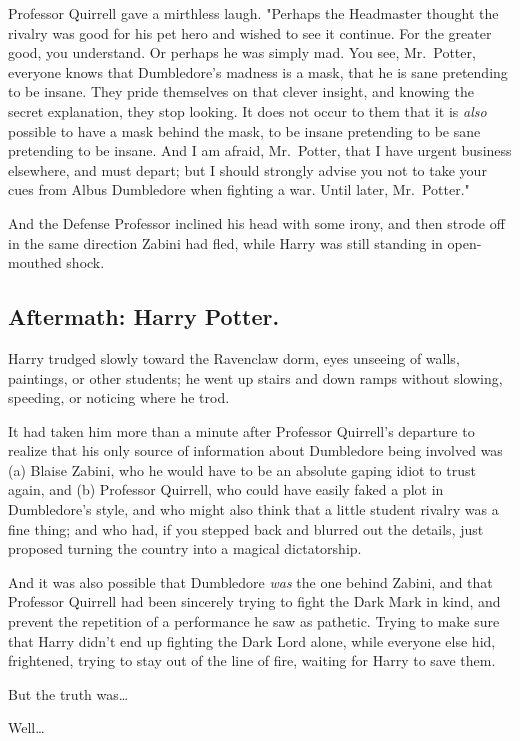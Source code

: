 Professor Quirrell gave a mirthless laugh. "Perhaps the Headmaster thought the 
rivalry was good for his pet hero and wished to see it continue. For the 
greater good, you understand. Or perhaps he was simply mad. You see, 
Mr.~Potter, everyone knows that Dumbledore's madness is a mask, that he is sane 
pretending to be insane. They pride themselves on that clever insight, and 
knowing the secret explanation, they stop looking. It does not occur to them 
that it is \emph{also} possible to have a mask behind the mask, to be insane 
pretending to be sane pretending to be insane. And I am afraid, Mr.~Potter, 
that I have urgent business elsewhere, and must depart; but I should strongly 
advise you not to take your cues from Albus Dumbledore when fighting a war. 
Until later, Mr.~Potter."

And the Defense Professor inclined his head with some irony, and then strode 
off in the same direction Zabini had fled, while Harry was still standing in 
open-mouthed shock.
\sbreak
\subsection{Aftermath: Harry Potter.}

Harry trudged slowly toward the Ravenclaw dorm, eyes unseeing of walls, 
paintings, or other students; he went up stairs and down ramps without slowing, 
speeding, or noticing where he trod.

It had taken him more than a minute after Professor Quirrell's departure to 
realize that his only source of information about Dumbledore being involved was 
(a) Blaise Zabini, who he would have to be an absolute gaping idiot to trust 
again, and (b) Professor Quirrell, who could have easily faked a plot in 
Dumbledore's style, and who might also think that a little student rivalry was 
a fine thing; and who had, if you stepped back and blurred out the details, 
just proposed turning the country into a magical dictatorship.

And it was also possible that Dumbledore \emph{was} the one behind Zabini, and 
that Professor Quirrell had been sincerely trying to fight the Dark Mark in 
kind, and prevent the repetition of a performance he saw as pathetic. Trying to 
make sure that Harry didn't end up fighting the Dark Lord alone, while everyone 
else hid, frightened, trying to stay out of the line of fire, waiting for Harry 
to save them.

But the truth was{\ldots}

Well{\ldots}

